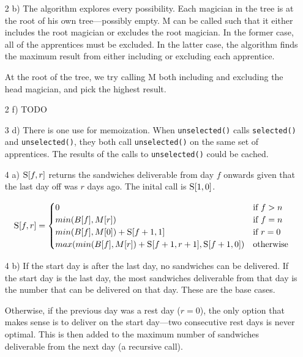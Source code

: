 \documentclass[]{article}
\begin{document}
\begin{itemize}
	\item [2 b)] The algorithm explores every possibility. Each magician in the tree is at the root of his own tree---possibly empty. \textsc{M} can be called such that it either includes the root magician or excludes the root magician. In the former case, all of the apprentices must be excluded. In the latter case, the algorithm finds the maximum result from either including or excluding each apprentice.
	
	At the root of the tree, we try calling \textsc{M} both including and excluding the head magician, and pick the highest result.
	
	\item [2 f)] TODO
	
	\item [3 d)] There is one use for memoization. When \texttt{unselected()} calls \texttt{selected()} and \texttt{unselected()}, they both call \texttt{unselected()} on the same set of apprentices. The results of the calls to \texttt{unselected()} could be cached.
	
	\item [4 a)] 
		$\textsc{S}[f, r]$ returns the sandwiches deliverable from day $f$ onwards given that the last day off was $r$ days ago. The inital call is $\textsc{S}[1, 0]$.
		
		$$
		\textsc{S}[f, r] =
		\begin{cases}
			0
			& \text{if } f > n \\
		
			min(B[f], M[r])
			& \text{if } f = n \\
			
			min(B[f], M[0]) + \textsc{S}[f+1, 1]
			& \text{if } r = 0 \\
			
			max(min(B[f], M[r]) + \textsc{S}[f+1, r+1], \textsc{S}[f+1,0])
			& \text{otherwise}
		\end{cases}
		$$
		
	\item [4 b)] If the start day is after the last day, no sandwiches can be delivered. If the start day is the last day, the most sandwiches deliverable from that day is the number that can be delivered on that day. These are the base cases.
	
	Otherwise, if the previous day was a rest day ($r=0$), the only option that makes sense is to deliver on the start day---two consecutive rest days is never optimal. This is then added to the maximum number of sandwiches deliverable from the next day (a recursive call).
	

\end{itemize}
\end{document}

